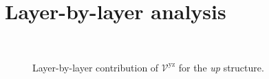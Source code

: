 \documentclass[prb,11pt,tightenlines,twocolumn,aps]{revtex4-1}
\begin{document}

\section{Layer-by-layer analysis} %
\label{sec:res-layer_by_layer_analysis}

\begin{figure}[t]
    \centering
    \\
    \caption{Layer-by-layer contribution of $\mathcal{V}^{\mathrm{yz}}$ for the
     \emph{up} structure.}
    \label{fig:up-vyz-lay}
\end{figure}
\end{document}
